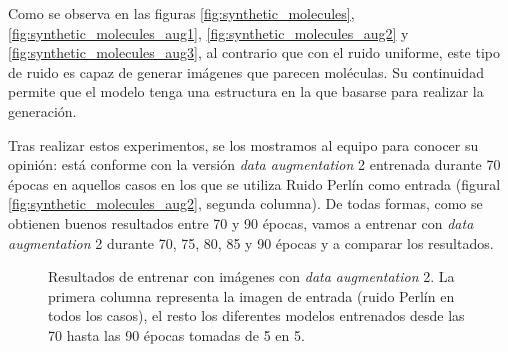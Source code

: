Como se observa en las figuras \ref{fig:synthetic_molecules}, \ref{fig:synthetic_molecules_aug1}, \ref{fig:synthetic_molecules_aug2} y \ref{fig:synthetic_molecules_aug3}, al contrario que con el ruido uniforme, este tipo de ruido es capaz de generar imágenes que parecen moléculas. Su continuidad permite que el modelo tenga una estructura en la que basarse para realizar la generación. 

Tras realizar estos experimentos, se los mostramos al equipo para conocer su opinión: está conforme con la versión \textit{data augmentation} 2 entrenada durante 70 épocas en aquellos casos en los que se utiliza Ruido Perlín como entrada (figural \ref{fig:synthetic_molecules_aug2}, segunda columna). De todas formas, como se obtienen buenos resultados entre 70 y 90 épocas, vamos a entrenar con \textit{data augmentation} 2 durante 70, 75, 80, 85 y 90 épocas y a comparar los resultados.

\begin{figure}[H]
\centering
    \caption{Resultados de entrenar con imágenes con \textit{data augmentation} 2. La primera columna representa la imagen de entrada (ruido Perlín en todos los casos), el resto los diferentes modelos entrenados desde las 70 hasta las 90 épocas tomadas de 5 en 5.}
    \label{fig:synthetic_molecules_aug2_extra} 
\end{figure}

